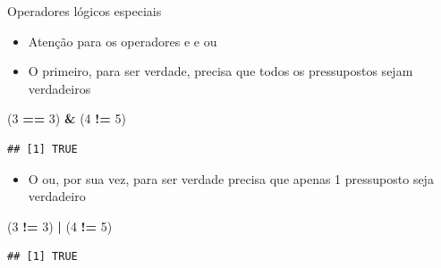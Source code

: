 \documentclass[
  10pt,
  ignorenonframetext,
]{beamer}
\newenvironment{Shaded}{\begin{snugshade}}{\end{snugshade}}
\newcommand{\DecValTok}[1]{\textcolor[rgb]{0.00,0.00,0.81}{#1}}
\newcommand{\NormalTok}[1]{#1}
\newcommand{\OperatorTok}[1]{\textcolor[rgb]{0.81,0.36,0.00}{\textbf{#1}}}
\newcommand{\StringTok}[1]{\textcolor[rgb]{0.31,0.60,0.02}{#1}}
\providecommand{\tightlist}{%
  \setlength{\itemsep}{0pt}\setlength{\parskip}{0pt}}
\begin{document}
\begin{frame}[fragile]{Operadores lógicos especiais}
\protect\hypertarget{operadores-luxf3gicos-especiais}{}
\begin{itemize}
\tightlist
\item
  Atenção para os operadores e e ou
\item
  O primeiro, para ser verdade, precisa que todos os pressupostos sejam
  verdadeiros
\end{itemize}

\begin{Shaded}
\begin{Highlighting}[]
\NormalTok{(}\DecValTok{3} \OperatorTok{==}\StringTok{ }\DecValTok{3}\NormalTok{) }\OperatorTok{\&}\StringTok{ }\NormalTok{(}\DecValTok{4} \OperatorTok{!=}\StringTok{ }\DecValTok{5}\NormalTok{)}
\end{Highlighting}
\end{Shaded}

\begin{verbatim}
## [1] TRUE
\end{verbatim}

\begin{itemize}
\tightlist
\item
  O ou, por sua vez, para ser verdade precisa que apenas 1 pressuposto
  seja verdadeiro
\end{itemize}

\begin{Shaded}
\begin{Highlighting}[]
\NormalTok{(}\DecValTok{3} \OperatorTok{!=}\StringTok{ }\DecValTok{3}\NormalTok{) }\OperatorTok{|}\StringTok{ }\NormalTok{(}\DecValTok{4} \OperatorTok{!=}\StringTok{ }\DecValTok{5}\NormalTok{)}
\end{Highlighting}
\end{Shaded}

\begin{verbatim}
## [1] TRUE
\end{verbatim}
\end{frame}
\end{document}
